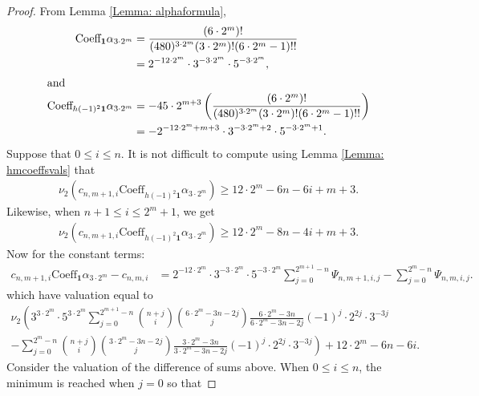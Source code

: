 \documentclass[10pt,a4paper]{amsart}
\numberwithin{equation}{section}
\theoremstyle{definition}
\begin{document}
\begin{proof}
    From Lemma \ref{Lemma: alphaformula},
    \begin{align*}
        \text{Coeff}_{\textbf{1}} \alpha_{3 \cdot 2^{m}} &= \frac{(6 \cdot 2^{m})!}{(480)^{3 \cdot 2^{m}} (3 \cdot 2^{m})! (6 \cdot 2^{m}-1)!!} \\
        &= 2^{-12\cdot 2^{m}} \cdot 3^{-3 \cdot 2^{m}} \cdot 5^{-3 \cdot 2^{m}}, \\
        \intertext{and}
        \text{Coeff}_{h(-1)^{2}\textbf{1}} \alpha_{3 \cdot 2^{m}} &= -45\cdot 2^{m+3} \left( \frac{(6 \cdot 2^{m})!}{(480)^{3 \cdot 2^{m}} (3 \cdot 2^{m})! (6 \cdot 2^{m}-1)!!} \right) \\
        &= -2^{-12 \cdot 2^{m} + m + 3} \cdot 3^{-3 \cdot 2^{m}+2} \cdot 5^{-3 \cdot 2^{m} +1}.
    \end{align*}
    Suppose that $0 \leq i \leq n$. It is not difficult to compute using Lemma \ref{Lemma: hmcoeffsvals} that
    \begin{align}
        \nu_{2}\left( c_{n,m+1,i} \text{Coeff}_{h(-1)^{2}\textbf{1}} \alpha_{3 \cdot 2^{m}} \right) \geq 12 \cdot 2^{m} - 6n - 6i + m + 3. \label{propineq1}
    \end{align}
    Likewise, when $n+1 \leq i \leq 2^{m}+1$, we get
     \begin{align}
        \nu_{2}\left( c_{n,m+1,i} \text{Coeff}_{h(-1)^{2}\textbf{1}} \alpha_{3 \cdot 2^{m}} \right) \geq 12 \cdot 2^{m} - 8n - 4i + m + 3. \label{propineq2}
    \end{align}
    Now for the constant terms:
    \begin{align*}
         c_{n,m+1,i} \text{Coeff}_{\textbf{1}} \alpha_{3 \cdot 2^{m}} - c_{n,m,i} &= 2^{-12\cdot 2^{m}} \cdot 3^{-3 \cdot 2^{m}} \cdot 5^{-3 \cdot 2^{m}} \sum_{j=0}^{2^{m+1}-n} \Psi_{n,m+1,i,j} - \sum_{j=0}^{2^{m}-n}\Psi_{n,m,i,j}.
    \end{align*}
   which have valuation equal to
   \begin{multline*}
       \nu_{2} \left( 3^{3 \cdot 2^{m}} \cdot 5^{3 \cdot 2^{m}} \sum_{j=0}^{2^{m+1}-n} \binom{n+j}{i} \binom{6 \cdot 2^{m}-3n-2j}{j} \frac{6 \cdot 2^{m}-3n}{6 \cdot 2^{m}-3n-2j} (-1)^{j} \cdot 2^{2j} \cdot 3^{-3j} \right. \\
       \left. - \sum_{j=0}^{2^{m}-n} \binom{n+j}{i} \binom{3 \cdot 2^{m}-3n-2j}{j} \frac{3 \cdot 2^{m}-3n}{3 \cdot 2^{m}-3n-2j} (-1)^{j} \cdot 2^{2j} \cdot 3^{-3j} \right) + 12 \cdot 2^{m}-6n-6i.
   \end{multline*}
    Consider the valuation of the difference of sums above. When $0 \leq i \leq n$, the minimum is reached when $j=0$ so that

\end{proof}
\end{document}

